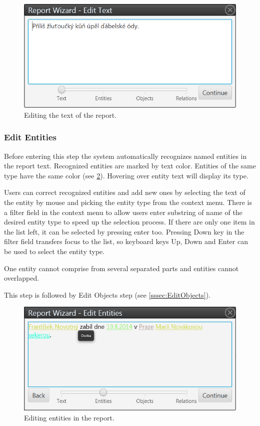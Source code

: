 \documentclass[12pt,a4paper]{report}
\begin{document}
\begin{figure}[!htb]
        \centering
        \includegraphics[width=\textwidth]{Images/reportedit}
        \caption{Editing the text of the report.}
        \label{fig:ReportEdit}
\end{figure}

\subsubsection{Edit Entities}
\label{sssec:EditEntities}

Before entering this step the system automatically recognizes named entities
in the report text. Recognized entities are marked by text color. Entities of
the same type have the same color (see \ref{fig:Entities}). Hovering over entity
text will display its type.

Users can correct recognized entities and add new ones by selecting the text
of the entity by mouse and picking the entity type from the context menu.
There is a filter field in the context menu to allow users enter substring of
name of the desired entity type to speed up the selection process. If there are
only one item in the list left, it can be selected by pressing enter too.
Pressing Down key in the filter field transfers focus to the list, so keyboard
keys Up, Down and Enter can be used to select the entity type.

One entity cannot comprise from several separated parts and entities cannot
overlapped.

This step is followed by Edit Objects step (see \ref{sssec:EditObjects}).

\begin{figure}[!htb]
        \centering
        \includegraphics[width=\textwidth]{Images/entities}
        \caption{Editing entities in the report.}
        \label{fig:Entities}
\end{figure}
\end{document}
